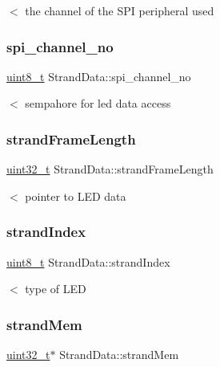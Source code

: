 $<$ the channel of the S\+PI peripheral used \mbox{\label{structStrandData_ab6b3cfdc586b5a40497eb3d2931af76e}} 
\subsubsection{\texorpdfstring{spi\+\_\+channel\+\_\+no}{spi\_channel\_no}}
{\footnotesize\ttfamily \hyperlink{vl53l0x__types_8h_aba7bc1797add20fe3efdf37ced1182c5}{uint8\+\_\+t} Strand\+Data\+::spi\+\_\+channel\+\_\+no}

$<$ sempahore for led data access \mbox{\label{structStrandData_a8c39b96e1d498cfede3c5880f5b353b1}} 
\subsubsection{\texorpdfstring{strand\+Frame\+Length}{strandFrameLength}}
{\footnotesize\ttfamily \hyperlink{vl53l0x__types_8h_a435d1572bf3f880d55459d9805097f62}{uint32\+\_\+t} Strand\+Data\+::strand\+Frame\+Length}

$<$ pointer to L\+ED data \mbox{\label{structStrandData_a37a37b2a2d7eddbfc9c2ac8f448beddf}} 
\subsubsection{\texorpdfstring{strand\+Index}{strandIndex}}
{\footnotesize\ttfamily \hyperlink{vl53l0x__types_8h_aba7bc1797add20fe3efdf37ced1182c5}{uint8\+\_\+t} Strand\+Data\+::strand\+Index}

$<$ type of L\+ED \mbox{\label{structStrandData_a187202b5a99913d82d24b81027bb007e}} 
\subsubsection{\texorpdfstring{strand\+Mem}{strandMem}}
{\footnotesize\ttfamily \hyperlink{vl53l0x__types_8h_a435d1572bf3f880d55459d9805097f62}{uint32\+\_\+t}$\ast$ Strand\+Data\+::strand\+Mem}

